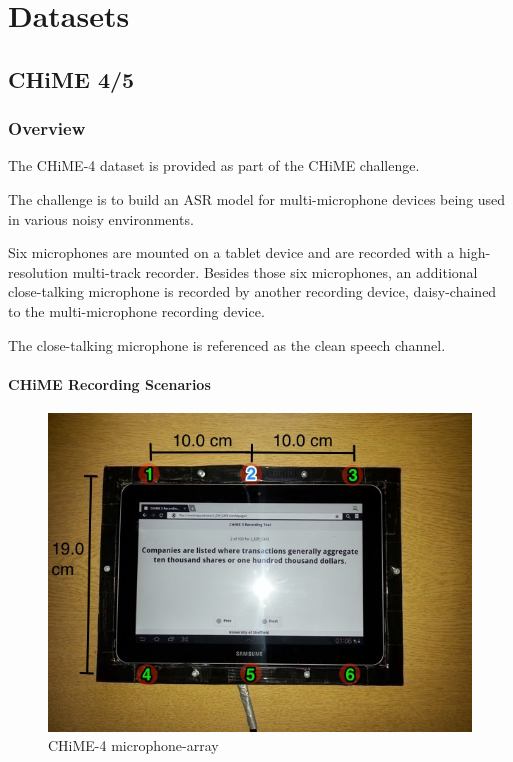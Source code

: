 \chapter{Datasets}\label{ch:datasets}
\section{CHiME 4/5}
\subsection{Overview}
The CHiME-4 dataset is provided 
as part of the CHiME challenge.

The challenge is to build an ASR model
for multi-microphone devices being used
in various noisy environments.

Six microphones are mounted on a tablet
device and are recorded with a high-resolution
multi-track recorder. Besides those six 
microphones, an additional 
close-talking microphone is recorded by
another recording device, daisy-chained to the
multi-microphone recording device.

The close-talking microphone is referenced as
the clean speech channel.

\subsubsection{CHiME Recording Scenarios}
\begin{figure}[H]
    \centering
    \includegraphics[width=0.75\linewidth]{Datasets/images/chime4_mic_array}
    \caption{CHiME-4 microphone-array}\label{fig:chime4_mic_array}
\end{figure}

